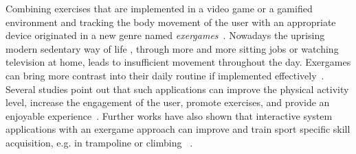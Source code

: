 Combining exercises that are implemented in a video game or a gamified environment and tracking the body movement of the user with an appropriate device originated in a new genre named \textit{exergames}~\cite{Buddharaju2016-ex, Sinclair2007-ex}.
Nowadays the uprising modern sedentary way of life , through more and more sitting jobs or watching television at home, leads to insufficient movement throughout the day.
Exergames can bring more contrast into their daily routine if implemented effectively~\cite{Rudella2012-ex}.
Several studies point out that such applications can improve the physical activity level, increase the engagement of the user, promote exercises, and provide an enjoyable experience~\cite{Graf2009-ex, Hicks2010-ex, Thin2010-ex}.
Further works have also shown that interactive system applications with an exergame approach can improve and train sport specific skill acquisition, e.g. in trampoline or climbing ~\cite{Bogdanovych2015-ci, Medeiros2017-ex, Holsti2013-kn, Jensen2014-ex, Kajastila2016-ot}.

